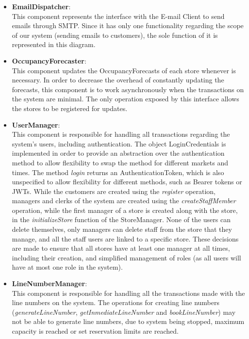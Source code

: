 \begin{itemize}
    \item \textbf{EmailDispatcher}: \\
    This component represents the interface with the E-mail Client to send emails through SMTP.
    Since it has only one functionality regarding the scope of our system (sending emails to customers), the sole function of it is represented in this diagram.
    \item \textbf{OccupancyForecaster}: \\
    This component updates the OccupancyForecasts of each store whenever is necessary.
    In order to decrease the overhead of constantly updating the forecasts, this component is to work asynchronously when the transactions on the system are minimal.
    The only operation exposed by this interface allows the stores to be registered for updates.
    \item \textbf{UserManager}: \\
    This component is responsible for handling all transactions regarding the system's users, including authentication.
    The object LoginCredentials is implemented in order to provide an abstraction over the authentication method to allow flexibility to swap the method for different markets and times.
    The method \textit{login} returns an AuthenticationToken, which is also unspecified to allow flexibility for different methods, such as Bearer tokens or JWTs.
    While the customers are created using the \textit{register} operation, managers and clerks of the system are created using the \textit{createStaffMember} operation, while the first manager of a store is created along with the store, in the \textit{initializeStore} function of the StoreManager.
    None of the users can delete themselves, only managers can delete staff from the store that they manage, and all the staff users are linked to a specific store.
    These decisions are made to ensure that all stores have at least one manager at all times, including their creation, and simplified management of roles (as all users will have at most one role in the system).
    \item \textbf{LineNumberManager}: \\
    This component is responsible for handling all the transactions made with the line numbers on the system.
    The operations for creating line numbers (\textit{generateLineNumber}, \textit{getInmediateLineNumber} and \textit{bookLineNumber}) may not be able to generate line numbers, due to system being stopped, maximum capacity is reached or set reservation limits are reached.

\end{itemize}

